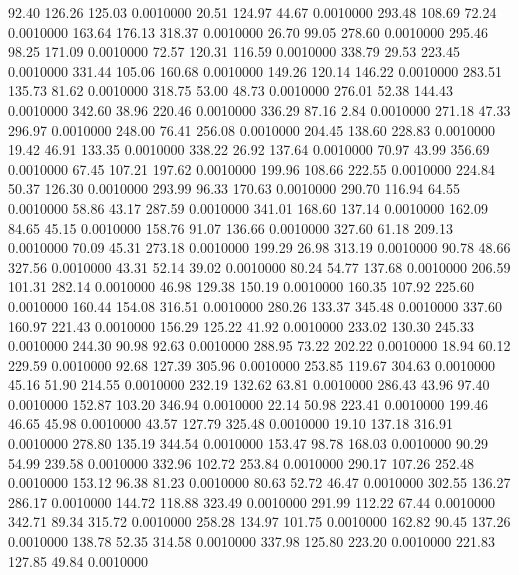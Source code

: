   92.40  126.26  125.03   0.0010000
  20.51  124.97   44.67   0.0010000
 293.48  108.69   72.24   0.0010000
 163.64  176.13  318.37   0.0010000
  26.70   99.05  278.60   0.0010000
 295.46   98.25  171.09   0.0010000
  72.57  120.31  116.59   0.0010000
 338.79   29.53  223.45   0.0010000
 331.44  105.06  160.68   0.0010000
 149.26  120.14  146.22   0.0010000
 283.51  135.73   81.62   0.0010000
 318.75   53.00   48.73   0.0010000
 276.01   52.38  144.43   0.0010000
 342.60   38.96  220.46   0.0010000
 336.29   87.16    2.84   0.0010000
 271.18   47.33  296.97   0.0010000
 248.00   76.41  256.08   0.0010000
 204.45  138.60  228.83   0.0010000
  19.42   46.91  133.35   0.0010000
 338.22   26.92  137.64   0.0010000
  70.97   43.99  356.69   0.0010000
  67.45  107.21  197.62   0.0010000
 199.96  108.66  222.55   0.0010000
 224.84   50.37  126.30   0.0010000
 293.99   96.33  170.63   0.0010000
 290.70  116.94   64.55   0.0010000
  58.86   43.17  287.59   0.0010000
 341.01  168.60  137.14   0.0010000
 162.09   84.65   45.15   0.0010000
 158.76   91.07  136.66   0.0010000
 327.60   61.18  209.13   0.0010000
  70.09   45.31  273.18   0.0010000
 199.29   26.98  313.19   0.0010000
  90.78   48.66  327.56   0.0010000
  43.31   52.14   39.02   0.0010000
  80.24   54.77  137.68   0.0010000
 206.59  101.31  282.14   0.0010000
  46.98  129.38  150.19   0.0010000
 160.35  107.92  225.60   0.0010000
 160.44  154.08  316.51   0.0010000
 280.26  133.37  345.48   0.0010000
 337.60  160.97  221.43   0.0010000
 156.29  125.22   41.92   0.0010000
 233.02  130.30  245.33   0.0010000
 244.30   90.98   92.63   0.0010000
 288.95   73.22  202.22   0.0010000
  18.94   60.12  229.59   0.0010000
  92.68  127.39  305.96   0.0010000
 253.85  119.67  304.63   0.0010000
  45.16   51.90  214.55   0.0010000
 232.19  132.62   63.81   0.0010000
 286.43   43.96   97.40   0.0010000
 152.87  103.20  346.94   0.0010000
  22.14   50.98  223.41   0.0010000
 199.46   46.65   45.98   0.0010000
  43.57  127.79  325.48   0.0010000
  19.10  137.18  316.91   0.0010000
 278.80  135.19  344.54   0.0010000
 153.47   98.78  168.03   0.0010000
  90.29   54.99  239.58   0.0010000
 332.96  102.72  253.84   0.0010000
 290.17  107.26  252.48   0.0010000
 153.12   96.38   81.23   0.0010000
  80.63   52.72   46.47   0.0010000
 302.55  136.27  286.17   0.0010000
 144.72  118.88  323.49   0.0010000
 291.99  112.22   67.44   0.0010000
 342.71   89.34  315.72   0.0010000
 258.28  134.97  101.75   0.0010000
 162.82   90.45  137.26   0.0010000
 138.78   52.35  314.58   0.0010000
 337.98  125.80  223.20   0.0010000
 221.83  127.85   49.84   0.0010000
